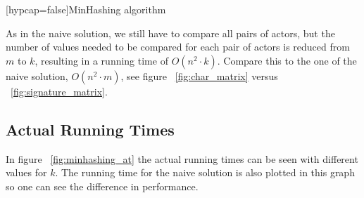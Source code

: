 \documentclass[a4paper,11pt]{article}
\makeatletter
\def\BState{\State\hskip-\ALG@thistlm}
\makeatother
\begin{document}
\begin{center}   
    [hypcap=false]{MinHashing algorithm}\label{alg:minhashing}
\end{center}

As in the naive solution, we still have to compare all pairs of actors, but the number of values needed to be compared for each pair of actors is reduced from $m$ to $k$, resulting in a running time of $O(n^2 \cdot k)$. Compare this to the one of the naive solution, $O(n^2 \cdot m)$, see figure ~\ref{fig:char_matrix} versus ~\ref{fig:signature_matrix}.

\subsection{Actual Running Times}
In figure ~\ref{fig:minhashing_at} the actual running times can be seen with different values for $k$. The running time for the naive solution is also plotted in this graph so one can see the difference in performance. \\
\end{document}
